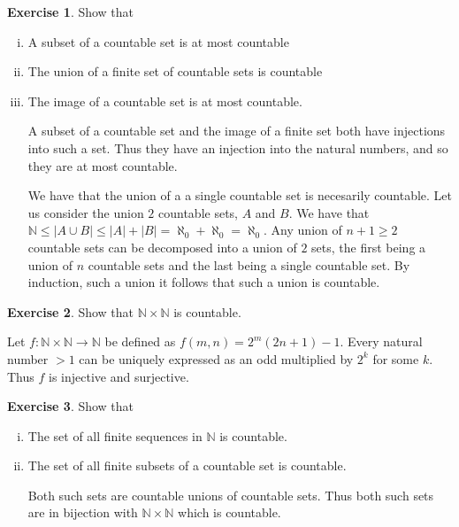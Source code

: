 \documentclass{article}
\theoremstyle{definition}
\newtheorem{exer}{Exercise}[section]
\newcommand{\N}{\mathbb{N}}
\newcommand{\abs}[1]{\lvert#1\rvert}
\newlength{\defparindent}
\newenvironment{answer}
    {\begin{mdframed}[backgroundcolor=gray!15, linewidth=0pt] \setlength{\parindent}{\defparindent}}
    {\end{mdframed}}
\begin{document}
\begin{exer}
    Show that 
    \begin{enumerate}[(i)]
        \item A subset of a countable set is at most countable
        \item The union of a finite set of countable sets is countable
        \item The image of a countable set is at most countable.
        \begin{answer}
            A subset of a countable set and the image of a finite set both have injections into such a set. Thus they have an injection into the natural numbers, and so they are at most countable.

            We have that the union of a a single countable set is necesarily countable. Let us consider the union $2$ countable sets, $A$ and $B$. We have that $\N \le \abs{A \cup B} \le \abs{A} + \abs{B} = \aleph_0 + \aleph_0 = \aleph_0$. Any union of $n + 1 \ge 2$ countable sets can be decomposed into a union of $2$ sets, the first being a union of $n$ countable sets and the last being a single countable set. By induction, such a union it follows that such a union is countable.
        \end{answer}
    \end{enumerate}
\end{exer}

\begin{exer}
    Show that $\N \times \N$ is countable. 
    \begin{answer}
        Let $f: \N \times \N \to \N$ be defined as $f(m, n) = 2^m(2n + 1) - 1$. Every natural number $> 1$ can be uniquely expressed as an odd multiplied by $2^k$ for some $k$. Thus $f$ is injective and surjective.
    \end{answer}
\end{exer}

\newpage 

\begin{exer}
    Show that 
    \begin{enumerate}[(i)]
        \item The set of all finite sequences in $\N$ is countable.
        \item The set of all finite subsets of a countable set is countable.
        \begin{answer}
            Both such sets are countable unions of countable sets. Thus both such sets are in bijection with $\N \times \N$ which is countable.
        \end{answer}
    \end{enumerate}
\end{exer}
\end{document}
